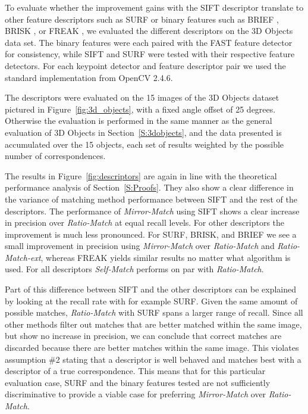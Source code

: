 \documentclass[review]{elsarticle}
\begin{document}
To evaluate whether the improvement gains with the SIFT descriptor translate to other feature descriptors such as SURF \cite{bay2006surf} or binary features such as BRIEF \cite{calonder2010brief}, BRISK \cite{leutenegger2011brisk}, or FREAK \cite{alahi2012freak}, we evaluated the different descriptors on the 3D Objects data set.  The binary features were each paired with the FAST feature detector for consistency, while SIFT and SURF were tested with their respective feature detectors.  For each keypoint detector and feature descriptor pair we used the standard implementation from OpenCV 2.4.6.

The descriptors were evaluated on the 15 images  of the 3D Objects dataset pictured in Figure~\ref{fig:3d_objects}, with a fixed angle offset of 25 degrees.  Otherwise the evaluation is performed in the same manner as the general evaluation of 3D Objects in Section~\ref{S:3dobjects}, and the data presented is accumulated over the 15 objects, each set of results weighted by the possible number of correspondences.

The results in Figure~\ref{fig:descriptors} are again in line with the theoretical performance analysis of Section~\ref{S:Proofs}. They also show a clear difference in the variance of matching method performance between SIFT and the rest of the descriptors. The performance of \emph{Mirror-Match} using SIFT shows a clear increase in precision over \emph{Ratio-Match} at equal recall levels. For other descriptors the improvement is much less pronounced.  For SURF, BRISK, and BRIEF we see a small improvement in precision using \emph{Mirror-Match} over \emph{Ratio-Match} and \emph{Ratio-Match-ext}, whereas FREAK yields similar results no matter what algorithm is used.  For all descriptors \emph{Self-Match} performs on par with \emph{Ratio-Match}.

Part of this difference between SIFT and the other descriptors can be explained by looking at the recall rate with for example SURF\@. Given the same amount of possible matches, \emph{Ratio-Match} with SURF spans a larger range of recall.  Since all other methods filter out matches that are better matched within the same image, but show no increase in precision, we can conclude that correct matches are discarded because there are better matches within the same image. This violates assumption \#2 stating that a descriptor is well behaved and matches best with a descriptor of a true correspondence. This means that for this particular evaluation case, SURF and the binary features tested are not sufficiently discriminative to provide a viable case for preferring \emph{Mirror-Match} over \emph{Ratio-Match}.
\end{document}
